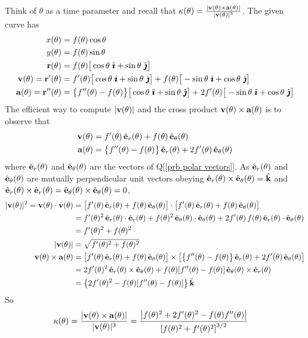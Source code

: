 \begin{solution}
Think of $\theta$ as a time parameter and recall that
$\kappa(\theta)=\frac{|\mathbf{v}(\theta)\times\mathbf{a}(\theta)|}{|\mathbf{v}(\theta)|^3}$.
The given curve has
\begin{align*}
x(\theta)&= f(\theta)\cos\theta\\
y(\theta)&= f(\theta)\sin\theta \\
\vr(\theta)&= f(\theta)\big[\cos\theta\ \hi + \sin\theta\ \hj\big] \\
\vv(\theta)=\vr'(\theta)&= f'(\theta)\big[\cos\theta\ \hi + \sin\theta\ \hj\big]
          +f(\theta)\big[-\sin\theta\ \hi + \cos\theta\ \hj\big] \\
\va(\theta)=\vr''(\theta)&= \big\{f''(\theta)-f(\theta)\big\}\big[\cos\theta\ \hi + \sin\theta\ \hj\big]
             +2f'(\theta)\big[-\sin\theta\ \hi + \cos\theta\ \hj\big]  
\end{align*}
The efficient way to compute $|\mathbf{v}(\theta)|$ and
the cross product $\mathbf{v}(\theta)\times\mathbf{a}(\theta)$
is to observe that
\begin{align*}
\mathbf{v}(\theta)&= f'(\theta)\,\hat{\mathbf{e}}_r(\theta) +f(\theta)\,\hat{\mathbf{e}}_\theta(\theta) \\
\mathbf{a}(\theta)&= \big\{f''(\theta)-f(\theta)\big\}\,\hat{\mathbf{e}}_r(\theta)
             +2f'(\theta)\,\hat{\mathbf{e}}_\theta(\theta)
\end{align*}
where $\hat{\mathbf{e}}_r(\theta)$ and $\hat{\mathbf{e}}_\theta(\theta)$ are the vectors of
Q[\ref{prb polar vectors}].  As $\hat{\mathbf{e}}_r(\theta)$ and $\hat{\mathbf{e}}_\theta(\theta)$
are mutually perpendicular unit vectors
obeying $\hat{\mathbf{e}}_r(\theta)\times\hat{\mathbf{e}}_\theta(\theta) =\hat{\mathbf{k}}$ and 
$\hat{\mathbf{e}}_r(\theta)\times\hat{\mathbf{e}}_r(\theta) = \hat{\mathbf{e}}_\theta(\theta)\times\hat{\mathbf{e}}_\theta(\theta) =0$,
\begin{align*}
|\mathbf{v}(\theta)|^2=\mathbf{v}(\theta)\cdot\mathbf{v}(\theta)
   &=\big[f'(\theta)\,\hat{\mathbf{e}}_r(\theta) +f(\theta)\,\hat{\mathbf{e}}_\theta(\theta)\big]\cdot
     \big[f'(\theta)\,\hat{\mathbf{e}}_r(\theta) +f(\theta)\,\hat{\mathbf{e}}_\theta(\theta)\big] \\
   &=f'(\theta)^2\,\hat{\mathbf{e}}_r(\theta)\cdot\hat{\mathbf{e}}_r(\theta)
     +f(\theta)^2\,\hat{\mathbf{e}}_\theta(\theta)\cdot\hat{\mathbf{e}}_\theta(\theta)
     +2f'(\theta)\,f(\theta)\,\hat{\mathbf{e}}_r(\theta)\cdot\hat{\mathbf{e}}_\theta(\theta) \\
   &=f'(\theta)^2+f(\theta)^2  \\
|\mathbf{v}(\theta)|& = \sqrt{f'(\theta)^2+f(\theta)^2}\\
\mathbf{v}(\theta)\times\mathbf{a}(\theta) 
 &=\big[f'(\theta)\,\hat{\mathbf{e}}_r(\theta) +f(\theta)\,\hat{\mathbf{e}}_\theta(\theta)\big]\times
   \big[\big\{f''(\theta)-f(\theta)\big\}\,\hat{\mathbf{e}}_r(\theta)
             +2f'(\theta)\,\hat{\mathbf{e}}_\theta(\theta)\big] \\
 &= 2f'(\theta)^2\,\hat{\mathbf{e}}_r(\theta)\times\hat{\mathbf{e}}_\theta(\theta)
  +f(\theta)[f''(\theta)-f(\theta)]\,\hat{\mathbf{e}}_\theta(\theta)\times\hat{\mathbf{e}}_r(\theta)
                                \\
 &= \big\{2f'(\theta)^2-f(\theta)[f''(\theta)-f(\theta)]\big\}
                                \,\hat{\mathbf{k}}
\end{align*}
So
\begin{align*}
\kappa(\theta)&=\frac{|\mathbf{v}(\theta)\times\mathbf{a}(\theta)|}{|\mathbf{v}(\theta)|^3}
=\frac{\big|f(\theta)^2+2f'(\theta)^2-f(\theta)f''(\theta)\big|}
                     {{[f(\theta)^2+f'(\theta)^2]}^{3/2}}
\end{align*}
\end{solution}
